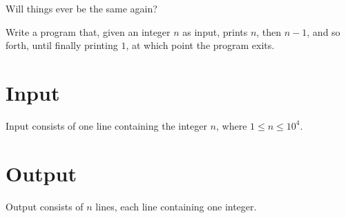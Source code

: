 
Will things ever be the same again?

Write a program that, given an integer $n$ as input, prints $n$, then $n-1$, and so forth, until finally printing $1$, at which point the program exits.

\section*{Input}
Input consists of one line containing the integer $n$, where $1 \leq n \leq 10^4$.

\section*{Output}
Output consists of $n$ lines, each line containing one integer.
